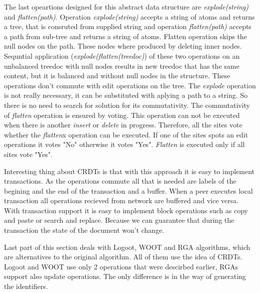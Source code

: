 \documentclass[12pt,oneside]{fithesis2}
\begin{document}
\par The last opeartions designed for this abstract data structure are \textit{explode(string)} and \textit{flatten(path)}. Operation \textit{explode(string)} accepts a string of atoms and returns a tree, that is consruted from supplied string and operation \textit{flatten(path)} accepts a path from sub-tree and returns a string of atoms. Flatten operation skips the null nodes on the path. These nodes where produced by deleting inner nodes. Sequntial application (\textit{explode(flatten(treedoc)}) of these two operations on an unbalanced treedoc with null nodes results in new treedoc that has the same content, but it is balanced and without null nodes in the structure. These operations don't commute with edit operations on the tree. The \textit{explode} operation is not really necessary, it can be substituted with aplying a path to a string. So there is no need to search for solution for its commutativity. The commutativity of \textit{flatten} operation is ensured by voting. This operation can not be executed when there is another \textit{insert} or \textit{delete} in progress. Therefore, all the sites vote whether the \textit{flatten}x operation can be executed. If one of the sites spots an edit operations it votes "No" otherwise it votes "Yes". \textit{Flatten} is executed only if all sites vote "Yes".
\par Interesting thing about CRDTs is that with this approach it is easy to implement transactions. As the operations commute all that is needed are labels of the begining and the end of the transaction and a buffer. When a peer executes local transaction all operations recieved from network are buffered and vice versa. With transaction support it is easy to implement block operations such as copy and paste or search and replace. Because we can guarantee that during the transaction the state of the document won't change.
\par Last part of this section deals with Logoot, WOOT and RGA algorithms, which are alternatives to the original algorithm. All of them use the idea of CRDTs. Logoot and WOOT use only 2 operations that were descirbed earlier, RGAs support also update operations. The only difference is in the way of generating the identifiers. 
\end{document}
